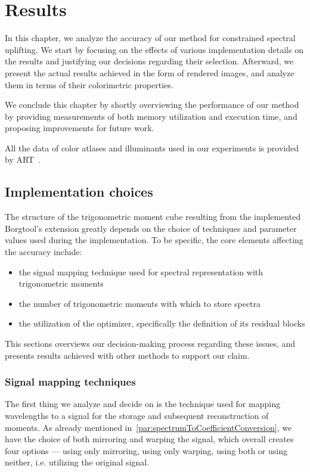 \chapter{Results} \label{chap:results}

In this chapter, we analyze the accuracy of our method for constrained spectral uplifting. We start by focusing on the effects of various implementation details on the results and justifying our decisions regarding their selection. Afterward, we present the actual results achieved in the form of rendered images, and analyze them in terms of their colorimetric properties.

We conclude this chapter by shortly overviewing the performance of our method by providing measurements of both memory utilization and execution time, and proposing improvements for future work.

All the data of color atlases and illuminants used in our experiments is provided by ART~\cite{ART}.

\section{Implementation choices}

The structure of the trigonometric moment cube resulting from the implemented Borgtool's extension greatly depends on the choice of techniques and parameter values used during the implementation. To be specific, the core elements affecting the accuracy include:
\begin{itemize}
	\item the signal mapping technique used for spectral representation with trigonometric moments
	\item the number of trigonometric moments with which to store spectra
	\item the utilization of the optimizer, specifically the definition of its residual blocks
\end{itemize}

This sections overviews our decision-making process regarding these issues, and presents results achieved with other methods to support our claim.

\subsection{Signal mapping techniques} \label{sec:storingMoments}
The first thing we analyze and decide on is the technique used for mapping wavelengths to a signal for the storage and subsequent reconstruction of moments. As already mentioned in~\cref{par:spectrumToCoefficientConversion}, we have the choice of both mirroring and warping the signal, which overall creates four options --- using only mirroring, using only warping, using both or using neither, i.e. utilizing the original signal.

